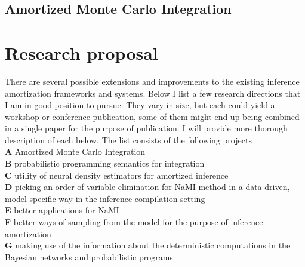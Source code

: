 \documentclass[12pt]{article}
\begin{document}
% 
% 

\subsection{Amortized Monte Carlo Integration}





\section{Research proposal}
There are several possible extensions and improvements to the existing inference amortization frameworks and systems. 
Below I list a few research directions that I am in good position to pursue.
They vary in size, but each could yield a workshop or conference publication, some of them might end up being combined in a single paper for the purpose of publication.
I will provide more thorough description of each below.
The list consists of the following projects\\
\textbf{A} \quad Amortized Monte Carlo Integration\\
\textbf{B} \quad probabilistic programming semantics for integration\\
\textbf{C} \quad utility of neural density estimators for amortized inference\\
\textbf{D} \quad picking an order of variable elimination for NaMI method in a data-driven, model-specific way in the inference compilation setting\\
\textbf{E} \quad better applications for NaMI\\
\textbf{F} \quad better ways of sampling from the model for the purpose of inference amortization\\
\textbf{G} \quad making use of the information about the deterministic computations in the Bayesian networks and probabilistic programs\\
\end{document}
